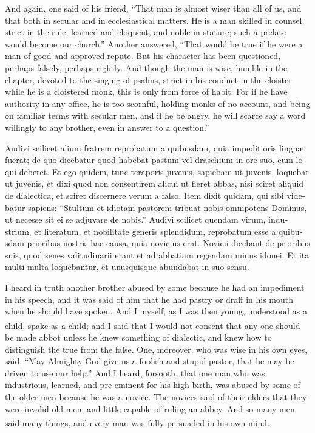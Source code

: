 \documentclass[10pt]{book}
\newcounter{engnote}
\newcommand{\engnotenum}{\textsuperscript{\arabic{engnote}\stepcounter{engnote}}}
\newcommand{\engnotetext}[1]{\vphantom{\footnotemark{}}\footnotetext{#1}}
\begin{document}
\begin{paracol}{2}
\switchcolumn

And again, one said of his friend, ``That man is almost wiser than all of us, and that both in secular and in ecclesiastical matters. He is a man skilled in counsel, strict in the rule, learned and eloquent, and noble in stature; such a prelate would become our church.'' Another answered, ``That would be true if he were a man of good and approved repute. But his character has been questioned, perhaps falsely, perhaps rightly. And though the man is wise, humble in the chapter, devoted to the singing of psalms, strict in his conduct in the cloister while he is a cloistered monk, this is only from force of habit. For if he have authority in any office, he is too scornful, holding monks of no account, and being on familiar terms with secular men, and if he be angry, he will scarce say a word willingly to any brother, even in answer to a question.''

\switchcolumn*

\begin{otherlanguage}{latin}
Audivi scilicet alium fratrem reprobatum a quibusdam, quia impeditioris lingu\ae{} fuerat; de quo dicebatur quod habebat pastum vel draschium in ore suo, cum loqui deberet. Et ego quidem, tunc teraporis juvenis,\engnotetext{I.\ Cor.\ xiii., \oldstylenums{11}.} sapiebam ut juvenis, loquebar ut juvenis, et dixi quod non consentirem alicui ut fieret abbas, nisi sciret aliquid de dialectica, et sciret discernere verum a falso. Item dixit quidam, qui sibi videbatur sapiens: ``Stultum et idiotam pastorem tribuat nobis omnipotens Dominus, ut necesse sit ei se adjuvare de nobis.'' Audivi scilicet quendam virum, industrium, et literatum, et nobilitate generis splendidum, reprobatum esse a quibusdam prioribus nostris hac causa, quia novicius erat. Novicii dicebant de prioribus suis, quod senes valitudinarii erant et ad abbatiam regendam minus idonei. Et ita multi multa loquebantur, et unusquisque abundabat in suo sensu.\engnotetext{Rom.\ xiv., \oldstylenums{5}.}
\end{otherlanguage}

\switchcolumn

I heard in truth another brother abused by some because he had an impediment in his speech, and it was said of him that he had pastry or draff in his mouth when he should have spoken. And I myself, as I was then young, understood as a child,\engnotenum{} spake as a child; and I said that I would not consent that any one should be made abbot unless he knew something of dialectic, and knew how to distinguish the true from the false. One, moreover, who was wise in his own eyes, said, ``May Almighty God give us a foolish and stupid pastor, that he may be driven to use our help.'' And I heard, forsooth, that one man who was industrious, learned, and pre-eminent for his high birth, was abused by some of the older men because he was a novice. The novices said of their elders that they were invalid old men, and little capable of ruling an abbey. And so many men said many things, and every man was fully persuaded in his own mind.\engnotenum{}


\end{paracol}
\end{document}
